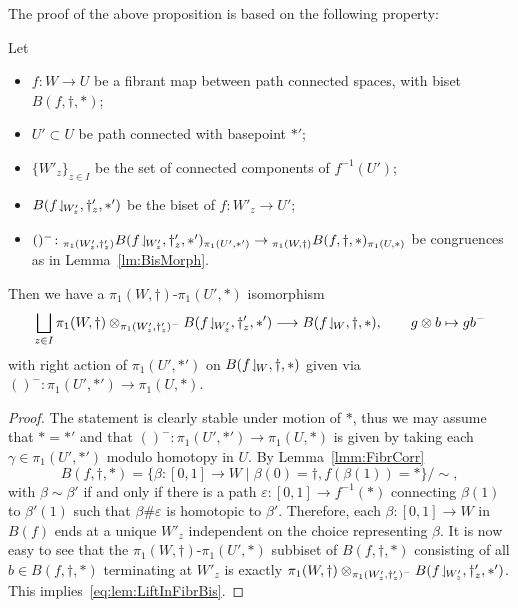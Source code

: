 \documentclass{amsart}
\begin{document}
\noindent The proof of the above proposition is based on the following
property:
\begin{lem}\label{lem:LiftInFibrBis}
  Let
  \begin{itemize}
  \item $f\colon W\to U$ be a fibrant map between path connected spaces,
    with biset $B(f,\dagger, *)$;
  \item $U'\subset U$ be path connected with basepoint $*'$;
  \item $\{W'_{z}\}_{z\in I}$ be the set of connected components of $f^{-1}(U')$;
  \item $B(f\!\downharpoonleft_{\!W'_z},\dagger'_z, *')$ be the biset of $f\colon W'_z\to U'$;
  \item $()^-\colon {}_{\pi_1(W'_z,\dagger'_z )}B(f\!\downharpoonleft_{\!W'_z},\dagger'_z, *') _{\pi_1(U',*') }\to {}_{\pi_1(W,\dagger)}B(f,\dagger, *)_{\pi_1(U,*)}$ be congruences as in Lemma~\ref{lm:BisMorph}.
  \end{itemize}
  Then we have a $\pi_1(W,\dagger)$-$\pi_1(U',*)$ isomorphism 
  \begin{equation}\label{eq:lem:LiftInFibrBis}
    \bigsqcup_{z\in I} \pi_1(W,\dagger) \otimes_{\pi_1(W'_z,\dagger'_z )^-} B(f\!\downharpoonleft_{\!W'_z}, \dagger'_z, *') \longrightarrow B(f\!\downharpoonleft_{\!W}, \dagger, *), \qquad g\otimes b\mapsto g b^-
  \end{equation}  
  with right action of $\pi_1(U',*')$ on $B(f\!\downharpoonleft_{\!W}, \dagger, *)$
  given via $()^-\colon\pi_1(U',*')\to\pi_1(U,*)$.
\end{lem}
\begin{proof}
  The statement is clearly stable under motion of $*$, thus we may assume
  that $*=*'$ and that $()^-\colon\pi_1(U', *')\to\pi_1(U, *)$ is given by
  taking each $\gamma\in \pi_1(U', *')$ modulo homotopy in $U$. By
  Lemma~\ref{lmm:FibrCorr}
  \[B(f,\dagger, *)=\{\beta\colon[0,1]\to W\mid\beta(0)=\dagger,f(\beta(1))=*\}/{\sim},
  \]
  with $\beta\sim \beta'$ if and only if there is a path
  $\varepsilon\colon[0,1]\to f^{-1}(*)$ connecting $\beta(1)$ to
  $\beta'(1)$ such that $\beta\#\varepsilon$ is homotopic to
  $\beta'$. Therefore, each $\beta\colon [0,1]\to W $ in $B(f)$ ends at a
  unique $W'_z$ independent on the choice representing $\beta$. It is now
  easy to see that the $\pi_1(W,\dagger)$-$\pi_1(U',*)$ subbiset of
  $B(f,\dagger, *)$ consisting of all $b\in B(f,\dagger, *)$ terminating at
  $W'_z$ is exactly $\pi_1(W,\dagger) \otimes_{\pi_1(W'_z,\dagger'_z )^-}
  B(f\!\downharpoonleft_{\!W'_z}, \dagger'_z, *')$. This
  implies~\eqref{eq:lem:LiftInFibrBis}.
 \end{proof}
\end{document}
